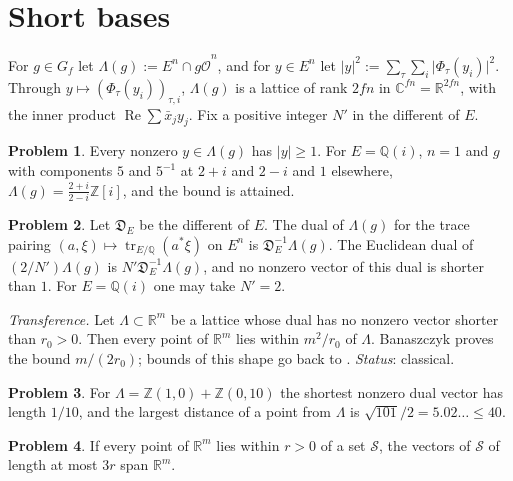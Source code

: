 \documentclass[reqno]{amsart}
\theoremstyle{definition}
\newtheorem{problem}{Problem}[section]
\theoremstyle{plain}
\theoremstyle{remark}
\newcommand{\Z}{\mathbb{Z}}
\newcommand{\Q}{\mathbb{Q}}
\newcommand{\R}{\mathbb{R}}
\newcommand{\C}{\mathbb{C}}
\newcommand{\Oh}{\hat{\mathcal{O}}}
\newcommand{\tr}{\operatorname{tr}}
\begin{document}
\section{Short bases}\label{sec:short}

For \(g\in G_f\) let \(\Lambda(g):=E^n\cap g\Oh^n\), and for \(y\in E^n\) let \(\lvert y\rvert^2:=\sum_\tau\sum_i\lvert\Phi_\tau(y_i)\rvert^2\).  Through \(y\mapsto(\Phi_\tau(y_i))_{\tau,i}\), \(\Lambda(g)\) is a lattice of rank \(2fn\) in \(\C^{fn}=\R^{2fn}\), with the inner product \(\operatorname{Re}\sum\bar x_jy_j\).  Fix a positive integer \(N'\) in the different of \(E\).

\begin{problem}\label{pr:first-min}
Every nonzero \(y\in\Lambda(g)\) has \(\lvert y\rvert\ge1\).  For \(E=\Q(i)\), \(n=1\) and \(g\) with components \(5\) and \(5^{-1}\) at \(2+i\) and \(2-i\) and \(1\) elsewhere, \(\Lambda(g)=\frac{2+i}{2-i}\Z[i]\), and the bound is attained.
\end{problem}

\begin{problem}\label{pr:dual}
Let \(\mathfrak D_E\) be the different of \(E\).  The dual of \(\Lambda(g)\) for the trace pairing \((a,\xi)\mapsto\tr_{E/\Q}(a^*\xi)\) on \(E^n\) is \(\mathfrak D_E^{-1}\Lambda(g)\).  The Euclidean dual of \((2/N')\Lambda(g)\) is \(N'\mathfrak D_E^{-1}\Lambda(g)\), and no nonzero vector of this dual is shorter than \(1\).  For \(E=\Q(i)\) one may take \(N'=2\).
\end{problem}

\emph{Transference.}  Let \(\Lambda\subset\R^m\) be a lattice whose dual has no nonzero vector shorter than \(r_0>0\).  Then every point of \(\R^m\) lies within \(m^2/r_0\) of \(\Lambda\).  Banaszczyk \cite{Ba} proves the bound \(m/(2r_0)\); bounds of this shape go back to \cite{LLS}.  \emph{Status}: classical.

\begin{problem}\label{pr:transference-example}
For \(\Lambda=\Z(1,0)+\Z(0,10)\) the shortest nonzero dual vector has length \(1/10\), and the largest distance of a point from \(\Lambda\) is \(\sqrt{101}/2=5.02\ldots\le40\).
\end{problem}

\begin{problem}\label{pr:cover-span}
If every point of \(\R^m\) lies within \(r>0\) of a set \(\mathcal S\), the vectors of \(\mathcal S\) of length at most \(3r\) span \(\R^m\).
\end{problem}
\end{document}
